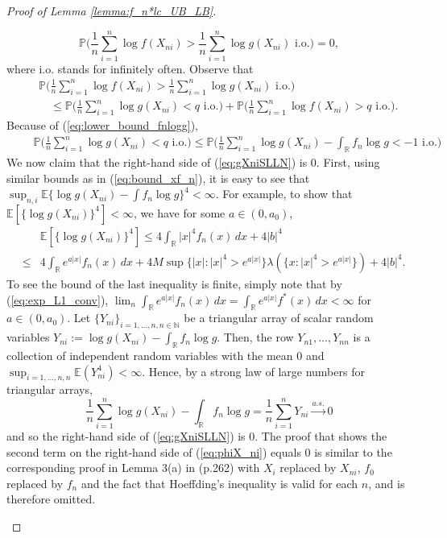 \documentclass[12pt,letterpaper, twoside, openany]{article}
\theoremstyle{plain}
\begin{document}
\begin{proof}[Proof of Lemma \ref{lemma:f_n*lc_UB_LB}]
\begin{enumerate}
\begin{equation}
		\mathbb{P} \bigg( \frac{1}{n} \sum^n_{i=1} \log f(X_{ni}) > \frac{1}{n} \sum^n_{i=1} \log g(X_{ni}) \text{ i.o.} \bigg) = 0,
	\end{equation}
	where i.o. stands for infinitely often. Observe that
	\begin{eqnarray}
		&& \mathbb{P} \bigg( \frac{1}{n} \sum^n_{i=1} \log f (X_{ni}) > \frac{1}{n} \sum^n_{i=1} \log g(X_{ni}) \text{ i.o.} \bigg) \nonumber \\
		&& \quad \leq \mathbb{P} \bigg( \frac{1}{n} \sum^n_{i=1} \log g(X_{ni}) < q \text{ i.o.} \bigg) +  \mathbb{P} \bigg( \frac{1}{n} \sum^n_{i=1} \log f(X_{ni}) > q \text{ i.o.} \bigg). \label{eq:phiX_ni}
	\end{eqnarray}
	Because of (\ref{eq:lower_bound_fnlogg}),
	\begin{eqnarray}\label{eq:gXniSLLN}
		\quad \quad \mathbb{P} \bigg( \frac{1}{n} \sum^n_{i=1} \log g(X_{ni}) < q \text{ i.o.} \bigg) \leq 
		\mathbb{P} \bigg( \frac{1}{n} \sum^n_{i=1} \log g(X_{ni}) -\int_\mathbb{R} f_n \log g < -1 \text{ i.o.} \bigg)
	\end{eqnarray}
	We now claim that the right-hand side of (\ref{eq:gXniSLLN}) is $0$. First, using similar bounds as in (\ref{eq:bound_xf_n}), it is easy to see that $\sup_{n,i} \mathbb{E}\{\log g(X_{ni}) - \int f_n \log g \}^4 < \infty$. For example, to show that $ \mathbb{E}[\{ \log g(X_{ni}) \}^4] < \infty$, we have for some $a \in (0, a_0)$,
	\begin{eqnarray*}
		&& \mathbb{E}[\{ \log g(X_{ni}) \}^4] \leq  4 \int_\mathbb{R} |x|^4 f_n(x) \, dx + 4|b|^4 \\
		& \leq & 4 \int_{\mathbb{R}} e^{a|x|}f_n(x)\, dx+ 4 M \sup \{|x|: |x|^4 > e^{a|x|}\} \lambda (\{x: |x|^4 > e^{a|x|}\}) + 4|b|^4.
	\end{eqnarray*}
	To see the bound of the last inequality is finite, simply note that by (\ref{eq:exp_L1_conv}), $\lim_n \int_{\mathbb{R}} e^{a|x|}f_n(x)\, dx = \int_{\mathbb{R}} e^{a|x|} f^*(x) \, dx < \infty$ for $a \in (0, a_0)$. Let $\{Y_{ni}\}_{i=1,\ldots,n,n \in \mathbb{N}}$ be a triangular array of scalar random variables $Y_{ni} := \log g(X_{ni}) -\int_\mathbb{R} f_n \log g$. Then, the row $Y_{n1},\ldots,Y_{nn}$ is a collection of independent random variables with the mean $0$ and $\sup_{i=1,\ldots,n,n} \mathbb{E}(Y_{ni}^4) < \infty$.	 Hence, by a strong law of large numbers for triangular arrays, 
	\begin{equation*}
		\frac{1}{n} \sum^n_{i=1} \log g(X_{ni}) -\int_\mathbb{R} f_n \log g = \frac{1}{n} \sum^n_{i=1} Y_{ni} \stackrel{a.s.}{\longrightarrow} 0
	\end{equation*}
	and so the right-hand side of (\ref{eq:gXniSLLN}) is $0$. The proof that shows the second term on the right-hand side of (\ref{eq:phiX_ni}) equals $0$ is similar to the corresponding proof in Lemma 3(a) in \cite{cule2010MLE_log_concave}  (p.262) with $X_i$ replaced by $X_{ni}$, $f_0$ replaced by $f_n$ and the fact that Hoeffding's inequality is valid for each $n$, and is therefore omitted.
	

\end{enumerate}
\end{proof}
\end{document}
